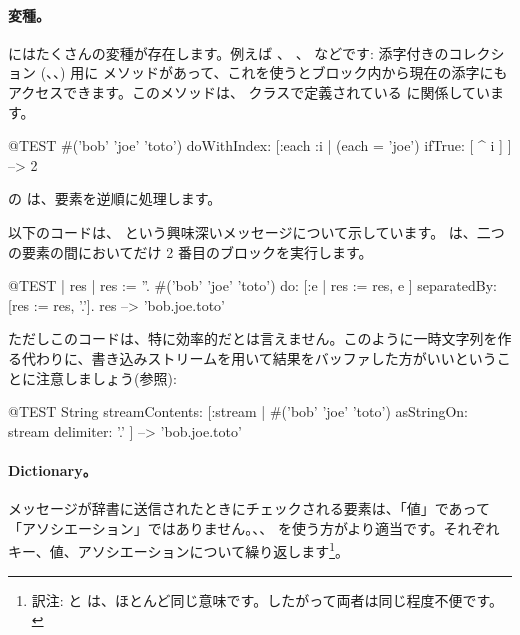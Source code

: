 \documentclass[a4paper,10pt,twoside]{book}
\begin{document}
\paragraph{変種。}  にはたくさんの変種が存在します。例えば 、 、  などです:
添字付きのコレクション (、、) 用に  メソッドがあって、これを使うとブロック内から現在の添字にもアクセスできます。このメソッドは、 クラスで定義されている  に関係しています。

\begin{code}{@TEST}
#('bob' 'joe' 'toto') doWithIndex: [:each :i | (each = 'joe') ifTrue: [ ^ i ] ] --> 2
\end{code}

 の  は、要素を逆順に処理します。

以下のコードは、 という興味深いメッセージについて示しています。
 は、二つの要素の間においてだけ 2 番目のブロックを実行します。
\begin{code}{@TEST | res | }
res := ''.
#('bob' 'joe' 'toto') do: [:e | res := res, e ] separatedBy: [res := res, '.'].
res --> 'bob.joe.toto'
\end{code}
\noindent
ただしこのコードは、特に効率的だとは言えません。このように一時文字列を作る代わりに、書き込みストリームを用いて結果をバッファした方がいいということに注意しましょう(参照):
\begin{code}{@TEST}
String streamContents: [:stream | #('bob' 'joe' 'toto') asStringOn: stream delimiter: '.' ] --> 'bob.joe.toto'
\end{code}



\paragraph{Dictionary。}
 メッセージが辞書に送信されたときにチェックされる要素は、「値」であって「アソシエーション」ではありません。、、  を使う方がより適当です。それぞれキー、値、アソシエーションについて繰り返します\footnote{訳注:  と  は、ほとんど同じ意味です。したがって両者は同じ程度不便です。}。
\end{document}
